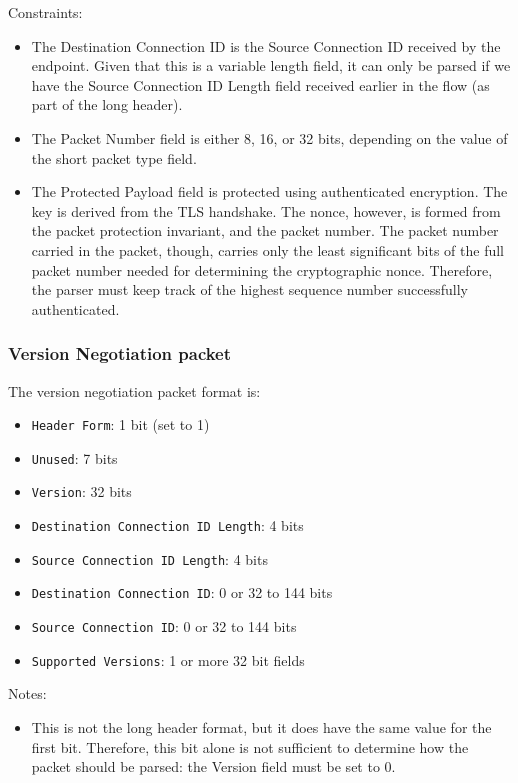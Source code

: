 \documentclass[10pt]{article}
\begin{document}
Constraints:
\begin{itemize}
\item The Destination Connection ID is the Source Connection ID received by the endpoint.
Given that this is a variable length field, it can only be parsed if we have the 
Source Connection ID Length field received earlier in the flow (as part of the long
header). 
\item The Packet Number field is either 8, 16, or 32 bits, depending on the value of the
short packet type field.
\item The Protected Payload field is protected using authenticated encryption. The key is
derived from the TLS handshake. The nonce, however, is formed from the packet protection
invariant, and the packet number. The packet number carried in the packet, though, carries
only the least significant bits of the full packet number needed for determining the
cryptographic nonce. Therefore, the parser must keep track of the highest sequence
number successfully authenticated.
\end{itemize}

\subsubsection*{Version Negotiation packet}

The version negotiation packet format is:
\begin{itemize}
\item \texttt{Header Form}: 1 bit (set to 1)
\item \texttt{Unused}: 7 bits
\item \texttt{Version}: 32 bits
\item \texttt{Destination Connection ID Length}: 4 bits
\item \texttt{Source Connection ID Length}: 4 bits
\item \texttt{Destination Connection ID}: 0 or 32 to 144 bits
\item \texttt{Source Connection ID}: 0 or 32 to 144 bits
\item \texttt{Supported Versions}: 1 or more 32 bit fields
\end{itemize}

Notes:
\begin{itemize}
\item This is not the long header format, but it does have the same value for the first
bit. Therefore, this bit alone is not sufficient to determine how the packet should be
parsed: the Version field must be set to 0.
\end{itemize}
\end{document}
